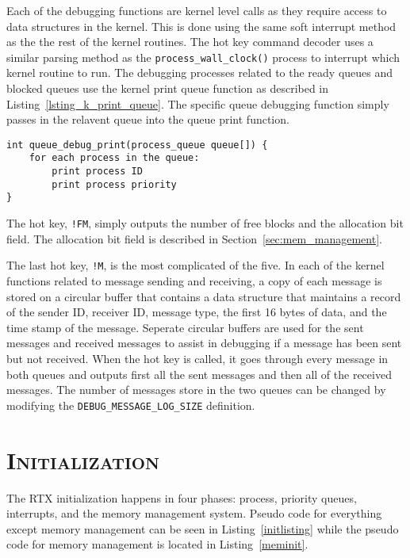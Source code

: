 \documentclass[oneside]{report}
\begin{document}
Each of the debugging functions are kernel level calls as they require access
to data structures in the kernel. This is done using the same soft interrupt
method as the the rest of the kernel routines. The hot key command decoder
uses a similar parsing method as the \texttt{process\_wall\_clock()} process to
interrupt which kernel routine to run. The debugging processes related to the
ready queues and blocked queues use the kernel print queue function as
described in Listing~\ref{lsting_k_print_queue}. The specific queue debugging 
function simply passes in the relavent queue into the queue print function.

\begin{lstlisting}
int queue_debug_print(process_queue queue[]) {
    for each process in the queue:
        print process ID
        print process priority
}
\end{lstlisting}

The hot key, \texttt{!FM}, simply outputs the number of free blocks and the
allocation bit field. The allocation bit field is described in
Section~\ref{sec:mem_management}.

The last hot key, \texttt{!M}, is the most complicated of the five. In each of
the kernel functions related to message sending and receiving, a copy of each
message is stored on a circular buffer that contains a data structure that
maintains a record of the sender ID, receiver ID, message type, the first 16
bytes of data, and the time stamp of the message. Seperate circular buffers are
used for the sent messages and received messages to assist in debugging if a
message has been sent but not received.  When the hot key is called, it goes
through every message in both queues and outputs first all the sent messages
and then all of the received messages. The number of messages store in the two
queues can be changed by modifying the \texttt{DEBUG\_MESSAGE\_LOG\_SIZE}
definition. 

\section{\textsc{Initialization}}
\label{sec:rtx_init}
The RTX initialization happens in four phases: process, priority queues, 
interrupts, and the memory management system. Pseudo code for everything except
memory management can be seen in Listing~\ref{initlisting} while the pseudo
code for memory management is located in Listing~\ref{meminit}.
\end{document}
